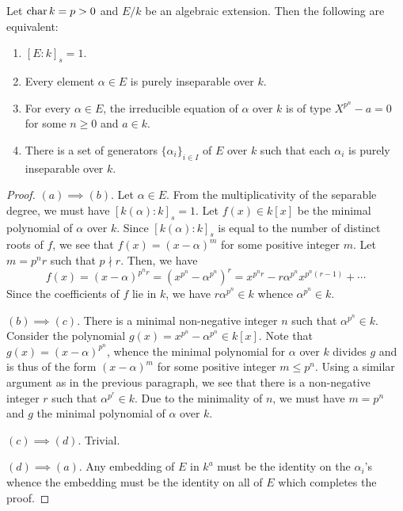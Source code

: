 \begin{theorem}
    Let $\operatorname{char} k = p > 0$ and $E/k$ be an algebraic extension. Then the following are equivalent: 
    \begin{enumerate}[label=(\alph*)]
        \item $[E:k]_s = 1$.
        \item Every element $\alpha\in E$ is purely inseparable over $k$. 
        \item For every $\alpha\in E$, the irreducible equation of $\alpha$ over $k$ is of type $X^{p^n} - a = 0$ for some $n\ge 0$ and $a\in k$.
        \item There is a set of generators $\{\alpha_i\}_{i\in I}$ of $E$ over $k$ such that each $\alpha_i$ is purely inseparable over $k$.
    \end{enumerate}
\end{theorem}
\begin{proof}
    $(a)\implies(b)$. Let $\alpha\in E$. From the multiplicativity of the separable degree, we must have $[k(\alpha):k]_s = 1$. Let $f(x)\in k[x]$ be the minimal polynomial of $\alpha$ over $k$. Since $[k(\alpha):k]_s$ is equal to the number of distinct roots of $f$, we see that $f(x) = (x - \alpha)^m$ for some positive integer $m$. Let $m = p^nr$ such that $p\nmid r$. Then, we have 
    \begin{equation*}
        f(x) = \left(x - \alpha\right)^{p^nr} = \left(x^{p^n} - \alpha^{p^n}\right)^r = x^{p^nr} - r\alpha^{p^n}x^{p^n(r - 1)} + \cdots
    \end{equation*}
    Since the coefficients of $f$ lie in $k$, we have $r\alpha^{p^n}\in k$ whence $\alpha^{p^n}\in k$.

    $(b)\implies(c)$. There is a minimal non-negative integer $n$ such that $\alpha^{p^n}\in k$. Consider the polynomial $g(x) = x^{p^n} - \alpha^{p^n}\in k[x]$. Note that $g(x) = (x - \alpha)^{p^n}$, whence the minimal polynomial for $\alpha$ over $k$ divides $g$ and is thus of the form $(x - \alpha)^{m}$ for some positive integer $m\le p^n$. Using a similar argument as in the previous paragraph, we see that there is a non-negative integer $r$ such that $\alpha^{p^r}\in k$. Due to the minimality of $n$, we must have $m = p^n$ and $g$ the minimal polynomial of $\alpha$ over $k$. 

    $(c)\implies(d)$. Trivial. 

    $(d)\implies(a)$. Any embedding of $E$ in $k^a$ must be the identity on the $\alpha_i$'s whence the embedding must be the identity on all of $E$ which completes the proof.
\end{proof}

